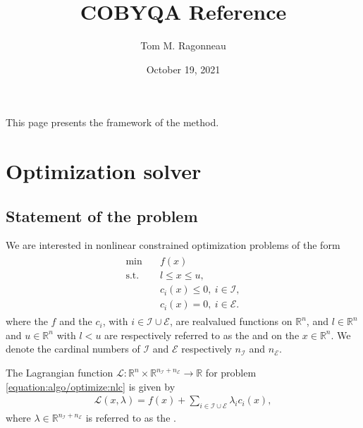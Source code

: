 \documentclass[letterpaper,10pt,english]{sphinxmanual}
\title{COBYQA Reference}
\date{October 19, 2021}
\author{Tom M. Ragonneau}
\def\R{\ensuremath{\mathds{R}}}
\newcommand{\dv}{x}
\newcommand{\icon}{i}
\newcommand{\lmv}{\lambda}
\newcommand{\nv}{n}
\newcommand{\bl}{l}
\newcommand{\bu}{u}
\newcommand{\con}[1][\icon]{c_{#1}}
\newcommand{\lag}{\mathcal{L}}
\newcommand{\meq}{n_{\scriptscriptstyle\seq}}
\newcommand{\mub}{n_{\scriptscriptstyle\sub}}
\newcommand{\obj}{f}
\newcommand{\seq}{\mathcal{E}}
\newcommand{\sub}{\mathcal{I}}
\begin{document}
\pagestyle{empty}
\sphinxmaketitle
\pagestyle{plain}
\sphinxtableofcontents
\pagestyle{normal}
\label{\detokenize{algo/index::doc}}


\sphinxAtStartPar
This page presents the framework of the method.


\chapter{Optimization solver}
\label{\detokenize{algo/optimize:optimization-solver}}\label{\detokenize{algo/optimize:optimize}}\label{\detokenize{algo/optimize::doc}}

\section{Statement of the problem}
\label{\detokenize{algo/optimize:statement-of-the-problem}}
\sphinxAtStartPar
We are interested in nonlinear constrained optimization problems of the form
\begin{equation}\label{equation:algo/optimize:nlc}
\begin{split}\begin{array}{ll}
    \min        & \quad \obj(\dv)\\
    \text{s.t.} & \quad \bl \le \dv \le \bu,\\
                & \quad \con(\dv) \le 0, ~ \icon \in \sub,\\
                & \quad \con(\dv) = 0, ~ \icon \in \seq.
\end{array}\end{split}
\end{equation}
\sphinxAtStartPar
where the  \(\obj\) and the 
\(\con\), with \(\icon \in \sub \cup \seq\), are real\sphinxhyphen{}valued functions
on \(\R^{\nv}\), and \(\bl \in \R^{\nv}\) and \(\bu \in \R^{\nv}\)
with \(\bl < \bu\) are respectively referred to as the  and
 on the  \(\dv \in \R^{\nv}\).
We denote the cardinal numbers of \(\sub\) and \(\seq\) respectively
\(\mub\) and \(\meq\).

\sphinxAtStartPar
The Lagrangian function \(\lag \colon \R^n \times \R^{\mub + \meq} \to \R\)
for problem \eqref{equation:algo/optimize:nlc} is given by
\begin{equation}\label{equation:algo/optimize:lag}
\begin{split}\lag(\dv, \lmv) = \obj(\dv) + \sum_{\icon \in \sub \cup \seq} \lmv_{\icon}
\con(\dv),\end{split}
\end{equation}
\sphinxAtStartPar
where \(\lmv \in \R^{\mub + \meq}\) is referred to as the .
\end{document}
